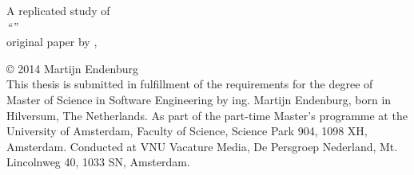 \null
\vspace{10em}

\begin{center}
	A replicated study of\\[1em]
	\textit{``\repltitle''}\\[1em]
	\footnotesize{original paper by \replauthor{}, \citeyear{karus2013}}\rm
\end{center}

\vfill

\noindent\copyright{ 2014} Martijn Endenburg\\[0.3cm]
This thesis is submitted in fulfillment of the requirements for the degree of
Master of Science in Software Engineering by ing. Martijn Endenburg, born in
Hilversum, The Netherlands. As part of the part-time Master's programme at the
University of Amsterdam, Faculty of Science, Science Park 904, 1098 XH,
Amsterdam. Conducted at VNU Vacature Media, De Persgroep Nederland, Mt.
Lincolnweg 40, 1033 SN, Amsterdam.

